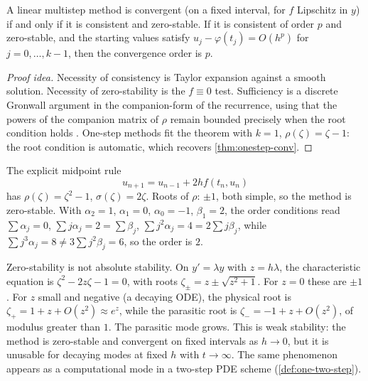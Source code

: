 \documentclass[11pt,a4paper]{article}
\begin{document}
\begin{theorem}
\label{thm:dahlquist-eq}
A linear multistep method is convergent (on a fixed interval, for \(f\) Lipschitz in \(y\)) if and only if it is consistent and zero-stable. If it is consistent of order \(p\) and zero-stable, and the starting values satisfy \(u_{j}-\varphi(t_{j})=O(h^{p})\) for \(j=0,\ldots,k-1\), then the convergence order is \(p\).
\end{theorem}

\begin{proof}[Proof idea]
Necessity of consistency is Taylor expansion against a smooth solution. Necessity of zero-stability is the \(f\equiv 0\) test. Sufficiency is a discrete Gronwall argument in the companion-form of the recurrence, using that the powers of the companion matrix of \(\rho\) remain bounded precisely when the root condition holds \cite[Ch.~III]{hairer93}. One-step methods fit the theorem with \(k=1\), \(\rho(\zeta)=\zeta-1\): the root condition is automatic, which recovers \cref{thm:onestep-conv}.
\end{proof}

\begin{example}
\label{ex:leapfrog-weak}
The explicit midpoint rule
\[
u_{n+1}=u_{n-1}+2h f(t_{n},u_{n})
\]
has \(\rho(\zeta)=\zeta^{2}-1\), \(\sigma(\zeta)=2\zeta\). Roots of \(\rho\): \(\pm 1\), both simple, so the method is zero-stable. With \(\alpha_{2}=1\), \(\alpha_{1}=0\), \(\alpha_{0}=-1\), \(\beta_{1}=2\), the order conditions read \(\sum\alpha_{j}=0\), \(\sum j\alpha_{j}=2=\sum\beta_{j}\), \(\sum j^{2}\alpha_{j}=4=2\sum j\beta_{j}\), while \(\sum j^{3}\alpha_{j}=8\neq 3\sum j^{2}\beta_{j}=6\), so the order is \(2\).

Zero-stability is not absolute stability. On \(y'=\lambda y\) with \(z=h\lambda\), the characteristic equation is \(\zeta^{2}-2z\zeta-1=0\), with roots \(\zeta_{\pm}=z\pm\sqrt{z^{2}+1}\). For \(z=0\) these are \(\pm 1\). For \(z\) small and negative (a decaying ODE), the physical root is \(\zeta_{+}=1+z+O(z^{2})\approx e^{z}\), while the parasitic root is \(\zeta_{-}=-1+z+O(z^{2})\), of modulus greater than \(1\). The parasitic mode grows. This is weak stability: the method is zero-stable and convergent on fixed intervals as \(h\to 0\), but it is unusable for decaying modes at fixed \(h\) with \(t\to\infty\). The same phenomenon appears as a computational mode in a two-step PDE scheme (\cref{def:one-two-step}).
\end{example}
\end{document}
